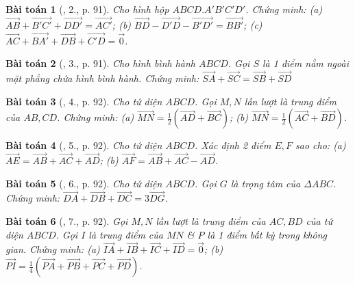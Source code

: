 \documentclass{article}
\numberwithin{equation}{section}
\newtheorem{baitoan}{Bài toán}
\begin{document}
\begin{baitoan}[\cite{SGK_Toan_11_hinh_hoc_co_ban}, 2., p. 91]
	Cho hình hộp $ABCD.A'B'C'D'$. Chứng minh: (a) $\overrightarrow{AB} + \overrightarrow{B'C'} + \overrightarrow{DD'} = \overrightarrow{AC'}$; (b) $\overrightarrow{BD} - \overrightarrow{D'D} - \overrightarrow{B'D'} = \overrightarrow{BB'}$; (c) $\overrightarrow{AC} + \overrightarrow{BA'} + \overrightarrow{DB} + \overrightarrow{C'D} = \vec{0}$.
\end{baitoan}

\begin{baitoan}[\cite{SGK_Toan_11_hinh_hoc_co_ban}, 3., p. 91]
	Cho hình bình hành $ABCD$. Gọi $S$ là 1 điểm nằm ngoài mặt phẳng chứa hình bình hành. Chứng minh: $\overrightarrow{SA} + \overrightarrow{SC} = \overrightarrow{SB} + \overrightarrow{SD}$
\end{baitoan}

\begin{baitoan}[\cite{SGK_Toan_11_hinh_hoc_co_ban}, 4., p. 92]
	Cho tứ diện $ABCD$. Gọi $M,N$ lần lượt là trung điểm của $AB,CD$. Chứng minh: (a) $\overrightarrow{MN} = \frac{1}{2}(\overrightarrow{AD} + \overrightarrow{BC})$; (b) $\overrightarrow{MN} = \frac{1}{2}(\overrightarrow{AC} + \overrightarrow{BD})$.
\end{baitoan}

\begin{baitoan}[\cite{SGK_Toan_11_hinh_hoc_co_ban}, 5., p. 92]
	Cho tứ diện $ABCD$. Xác định 2 điểm $E,F$ sao cho: (a) $\overrightarrow{AE} = \overrightarrow{AB} + \overrightarrow{AC} + \overrightarrow{AD}$; (b) $\overrightarrow{AF} = \overrightarrow{AB} + \overrightarrow{AC} - \overrightarrow{AD}$.
\end{baitoan}

\begin{baitoan}[\cite{SGK_Toan_11_hinh_hoc_co_ban}, 6., p. 92]
	Cho tứ diện $ABCD$. Gọi $G$ là trọng tâm của $\Delta ABC$. Chứng minh: $\overrightarrow{DA} + \overrightarrow{DB} + \overrightarrow{DC} = 3\overrightarrow{DG}$.
\end{baitoan}

\begin{baitoan}[\cite{SGK_Toan_11_hinh_hoc_co_ban}, 7., p. 92]
	Gọi $M,N$ lần lượt là trung điểm của $AC,BD$ của tứ diện $ABCD$. Gọi $I$ là trung điểm của $MN$ \& $P$ là 1 điểm bất kỳ trong không gian. Chứng minh: (a) $\overrightarrow{IA} + \overrightarrow{IB} + \overrightarrow{IC} + \overrightarrow{ID} = \vec{0}$; (b) $\overrightarrow{PI} = \frac{1}{4}(\overrightarrow{PA} + \overrightarrow{PB} + \overrightarrow{PC} + \overrightarrow{PD})$.
\end{baitoan}
\end{document}

